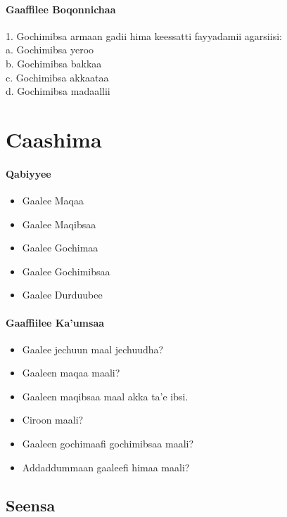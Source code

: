 \documentclass[11pt,b5paper]{book}
\begin{document}
\subsubsection{Gaaffilee Boqonnichaa}
1. Gochimibsa armaan gadii hima keessatti fayyadamii agarsiisi:\\
a. Gochimibsa yeroo\\
b. Gochimibsa bakkaa\\
c. Gochimibsa akkaataa\\
d. Gochimibsa madaallii\\

\newpage

\chapter{Caashima}
\subsubsection{Qabiyyee}
\begin{itemize}
	\item Gaalee Maqaa
	\item Gaalee Maqibsaa
	\item Gaalee Gochimaa
	\item Gaalee Gochimibsaa
	\item Gaalee Durduubee
\end{itemize}
\subsubsection{Gaaffiilee Ka'umsaa}
\begin{itemize}
	\item Gaalee jechuun maal jechuudha?
	\item Gaaleen maqaa maali?
	\item Gaaleen maqibsaa maal akka ta'e ibsi.
	\item Ciroon maali?
	\item Gaaleen gochimaafi gochimibsaa maali?
	\item Addaddummaan gaaleefi himaa maali?
\end{itemize}
	
	\section{Seensa}
	
\end{document}
